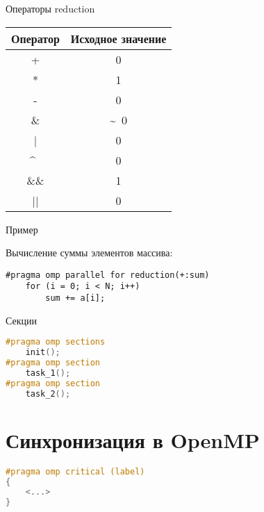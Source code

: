 \begin{frame}{Операторы reduction}
\begin{table}[htpb]
    \centering
    \begin{tabular}{|c|c|}
    \hline
    Оператор    &   Исходное значение   \\
    \hline
    +           &   0                   \\
    \hline
    *           &   1                   \\
    \hline
    -           &   0                   \\
    \hline
    \&          &   \~~0                \\
    \hline
    |           &   0                   \\
    \hline
    \^~         &   0                   \\
    \hline
    \&\&        &   1                   \\
    \hline
    ||          &   0                   \\
    \hline
    \end{tabular}
\end{table}
\end{frame}

\begin{frame}[fragile]{Пример}

Вычисление суммы элементов массива:

\begin{lstlisting}
#pragma omp parallel for reduction(+:sum)
    for (i = 0; i < N; i++)
        sum += a[i];
\end{lstlisting}

\end{frame}

\begin{frame}[fragile]{Секции}

\begin{lstlisting}[language=C++,basicstyle=\ttfamily,keywordstyle=\color{blue},basicstyle=\scriptsize]
#pragma omp sections
    init();
#pragma omp section
    task_1();
#pragma omp section
    task_2();
\end{lstlisting}

\end{frame}

\section{Синхронизация в OpenMP}

\begin{frame}[fragile]

\begin{lstlisting}[language=C++,basicstyle=\ttfamily,keywordstyle=\color{blue},basicstyle=\scriptsize]
#pragma omp critical (label)
{
    <...>
}
\end{lstlisting}

\end{frame}

